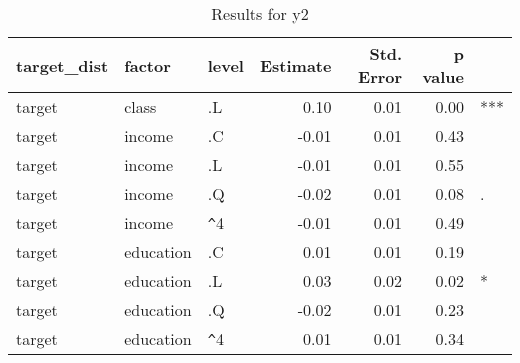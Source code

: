 \begin{table}[ht]
\centering
\begin{tabular}{lllrrrl}
  \hline
target\_dist & factor & level & Estimate & Std. Error & p value &  \\ 
  \hline
target & class & .L & 0.10 & 0.01 & 0.00 & *** \\ 
  target & income & .C & -0.01 & 0.01 & 0.43 &  \\ 
  target & income & .L & -0.01 & 0.01 & 0.55 &  \\ 
  target & income & .Q & -0.02 & 0.01 & 0.08 & . \\ 
  target & income & \verb|^|4 & -0.01 & 0.01 & 0.49 &  \\ 
  target & education & .C & 0.01 & 0.01 & 0.19 &  \\ 
  target & education & .L & 0.03 & 0.02 & 0.02 & * \\ 
  target & education & .Q & -0.02 & 0.01 & 0.23 &  \\ 
  target & education & \verb|^|4 & 0.01 & 0.01 & 0.34 &  \\ 
   \hline
\end{tabular}
\caption{Results for y2} 
\end{table}

